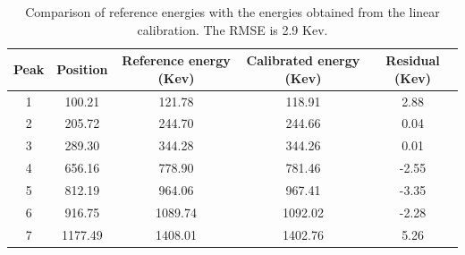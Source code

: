 \begin{table}[htbp]
    \centering
    \begin{tabular}{ccccc}
        \toprule
        Peak & Position & Reference energy (Kev) & Calibrated energy (Kev) & Residual (Kev) \\
        \midrule
        1 & 100.21  & 121.78  & 118.91  & 2.88 \\
        2 & 205.72  & 244.70  & 244.66  & 0.04 \\
        3 & 289.30  & 344.28  & 344.26  & 0.01 \\
        4 & 656.16  & 778.90  & 781.46  & -2.55 \\
        5 & 812.19  & 964.06  & 967.41  & -3.35 \\
        6 & 916.75  & 1089.74 & 1092.02 & -2.28 \\
        7 & 1177.49 & 1408.01 & 1402.76 & 5.26 \\
        \bottomrule
    \end{tabular}
    \caption{Comparison of reference energies with the energies obtained from the linear calibration. The RMSE is 2.9 Kev.}
    \label{tab:calibration}
\end{table}
